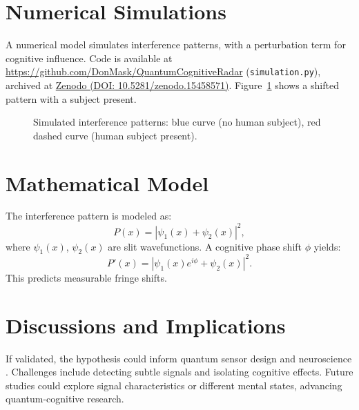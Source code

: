\documentclass[12pt]{article}
\begin{document}
\section{Numerical Simulations}
A numerical model simulates interference patterns, with a perturbation term for cognitive influence. Code is available at \url{https://github.com/DonMask/QuantumCognitiveRadar} (\texttt{simulation.py}), archived at \href{https://doi.org/10.5281/zenodo.15458571}{Zenodo (DOI: 10.5281/zenodo.15458571)}. Figure~\ref{fig:interference} shows a shifted pattern with a subject present.

\begin{figure}[!ht]
\vspace{0.5cm}
\centering
{}
\caption{Simulated interference patterns: blue curve (no human subject), red dashed curve (human subject present).}
\label{fig:interference}
\vspace{0.5cm}
\end{figure}

\section{Mathematical Model}
The interference pattern is modeled as:
\begin{equation}
P(x) = \left| \psi_1(x) + \psi_2(x) \right|^2,
\end{equation}
where \(\psi_1(x)\), \(\psi_2(x)\) are slit wavefunctions. A cognitive phase shift \(\phi\) yields:
\begin{equation}
P'(x) = \left| \psi_1(x)e^{i\phi} + \psi_2(x) \right|^2.
\end{equation}
This predicts measurable fringe shifts.

\section{Discussions and Implications}
If validated, the hypothesis could inform quantum sensor design and neuroscience \cite{penrose1989emperors}. Challenges include detecting subtle signals and isolating cognitive effects. Future studies could explore signal characteristics or different mental states, advancing quantum-cognitive research.
\end{document}

